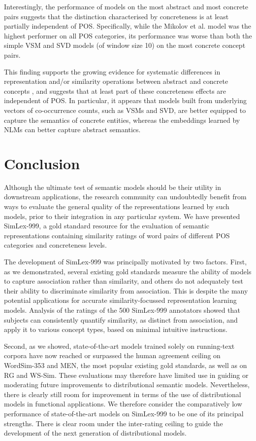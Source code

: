 Interestingly, the performance of models on the most abstract and most concrete pairs suggests that the distinction characterised by concreteness is at least partially independent of POS. Specifically, while the Mikolov et al. model was the highest performer on all POS categories, its performance was worse than both the simple VSM and SVD models (of window size 10) on the most concrete concept pairs.

This finding supports the growing evidence for systematic differences in representation and/or similarity operations between abstract and concrete concepts \cite{hill2013concreteness}, and suggests that at least part of these concreteness effects are independent of POS. In particular, it appears that models built from underlying vectors of co-occurrence counts, such as VSMs and SVD, are better equipped to capture the semantics of concrete entities, whereas the embeddings learned by NLMs can better capture abstract semantics. 

\section{Conclusion} 

Although the ultimate test of semantic models should be their utility in downstream applications, the research community can undoubtedly benefit from ways to evaluate the general quality of the representations learned by such models, prior to their integration in any particular system. We have presented SimLex-999, a gold standard resource for the evaluation of semantic representations containing similarity ratings of word pairs of different POS categories and concreteness levels. 

The development of SimLex-999 was principally motivated by two factors. First, as we demonstrated, several existing gold standards measure the ability of models to capture association rather than similarity, and others do not adequately test their ability to discriminate similarity from association. This is despite the many potential applications for accurate similarity-focussed representation learning models. Analysis of the ratings of the 500 SimLex-999 annotators showed that subjects can consistently quantify similarity, as distinct from association, and apply it to various concept types, based on minimal intuitive instructions. 

Second, as we showed, state-of-the-art models trained solely on running-text corpora have now reached or surpassed the human agreement ceiling on WordSim-353 and MEN, the most popular existing gold standards, as well as on RG and WS-Sim. These evaluations may therefore have limited use in guiding or moderating future improvements to distributional semantic models. Nevertheless, there is clearly still room for improvement in terms of the use of distributional models in functional applications. We therefore consider the comparatively low performance of state-of-the-art models on SimLex-999 to be one of its principal strengths. There is clear room under the inter-rating ceiling to guide the development of the next generation of distributional models. 


